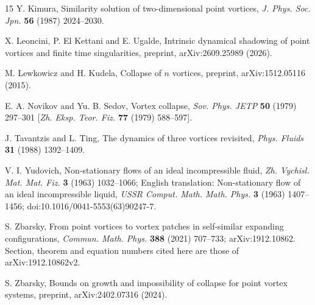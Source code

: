 \documentclass[11pt]{article}
\theoremstyle{definition}
\begin{document}
\begin{thebibliography}{15}
 Y. Kimura, Similarity solution of two-dimensional point vortices, \emph{J. Phys. Soc. Jpn.} \textbf{56} (1987) 2024--2030.

 X. Leoncini, P. El Kettani and E. Ugalde, Intrinsic dynamical shadowing of point vortices and finite time singularities, preprint, arXiv:2609.25989 (2026).

 M. Lewkowicz and H. Kudela, Collapse of $n$ vortices, preprint, arXiv:1512.05116 (2015).

 E. A. Novikov and Yu. B. Sedov, Vortex collapse, \emph{Sov. Phys. JETP} \textbf{50} (1979) 297--301 [\emph{Zh. Eksp. Teor. Fiz.} \textbf{77} (1979) 588--597].

 J. Tavantzis and L. Ting, The dynamics of three vortices revisited, \emph{Phys. Fluids} \textbf{31} (1988) 1392--1409.

 V. I. Yudovich, Non-stationary flows of an ideal incompressible fluid, \emph{Zh. Vychisl. Mat. Mat. Fiz.} \textbf{3} (1963) 1032--1066; English translation: Non-stationary flow of an ideal incompressible liquid, \emph{USSR Comput. Math. Math. Phys.} \textbf{3} (1963) 1407--1456; doi:10.1016/0041-5553(63)90247-7.

 S. Zbarsky, From point vortices to vortex patches in self-similar expanding configurations, \emph{Commun. Math. Phys.} \textbf{388} (2021) 707--733; arXiv:1912.10862. Section, theorem and equation numbers cited here are those of arXiv:1912.10862v2.

 S. Zbarsky, Bounds on growth and impossibility of collapse for point vortex systems, preprint, arXiv:2402.07316 (2024).

\end{thebibliography}
\end{document}
